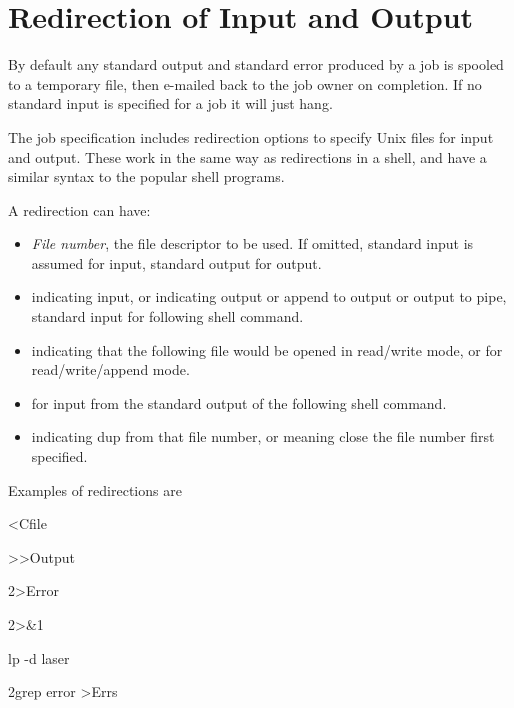 \section[Redirection of Input and Output]{Redirection of Input and Output}
By default any standard output and standard error produced by a job is spooled to a temporary file, then e-mailed back to the job owner on
completion. If no standard input is specified for a job it will just hang.

The job specification includes redirection options to specify Unix files for input and output. These work in the same way as redirections in a
shell, and have a similar syntax to the popular shell programs.

A redirection can have:

\begin{itemize}
\item \textit{File number}, the file descriptor to be used. If omitted, standard input is assumed for input, standard output for output.
\item \exampletext{{\textless}} indicating input, or \exampletext{{\textgreater}} indicating output or
\exampletext{{\textgreater}{\textgreater}} append to output or \exampletext{{\textbar}} output to pipe, standard input for
following shell command.
\item \exampletext{{\textless}{\textgreater}} indicating that the following file would be opened in read/write mode, or
\exampletext{{\textless}{\textgreater}{\textgreater}} for read/write/append mode.
\item \exampletext{{\textless}{\textbar}} for input from the standard output of the following shell command.
\item \exampletext{\&} indicating dup from that file number, or
\exampletext{\&-} meaning close the file number first specified.
\end{itemize}
Examples of redirections are

\begin{expara}

{\textless}Cfile

{\textgreater}{\textgreater}Output

2{\textgreater}Error

2{\textgreater}\&1

{\textbar}lp -d laser

2{\textbar}grep error {\textgreater}Errs

\end{expara}

